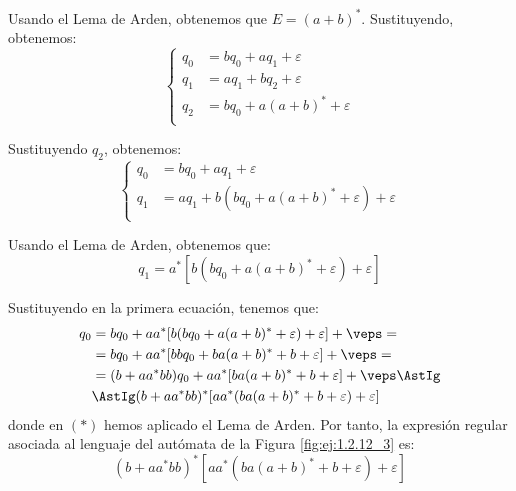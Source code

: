 \begin{ejercicio}
\begin{enumerate}
        Usando el Lema de Arden, obtenemos que $E=(a+b)^*$. Sustituyendo, obtenemos:
        \begin{equation*}
            \begin{cases}
                q_0 &= bq_0 + aq_1 + \varepsilon\\
                q_1 &= aq_1 + bq_2 + \varepsilon\\
                q_2 &= bq_0 + a(a+b)^* + \varepsilon\\
            \end{cases}
        \end{equation*}

        Sustituyendo $q_2$, obtenemos:
        \begin{equation*}
            \begin{cases}
                q_0 &= bq_0 + aq_1 + \varepsilon\\
                q_1 &= aq_1 + b(bq_0 + a(a+b)^* + \varepsilon) + \varepsilon\\
            \end{cases}
        \end{equation*}

        Usando el Lema de Arden, obtenemos que:
        \begin{equation*}
            q_1 = a^*[b(bq_0 + a(a+b)^* + \varepsilon) + \varepsilon]
        \end{equation*}

        Sustituyendo en la primera ecuación, tenemos que:
        \begin{align*}
            q_0 &= bq_0 +aa^*[b(bq_0 + a(a+b)^* + \varepsilon) + \varepsilon] + \veps=\\
            &= bq_0 + aa^*[bbq_0 + ba(a+b)^* + b + \varepsilon] + \veps =\\
            &= (b+aa^*bb)q_0 + aa^*[ba(a+b)^* + b + \varepsilon] + \veps \AstIg\\
            &\AstIg (b+aa^*bb)^*[aa^*(ba(a+b)^* + b + \varepsilon)+\varepsilon]
        \end{align*}
        donde en $(\ast)$ hemos aplicado el Lema de Arden.
        Por tanto, la expresión regular asociada al lenguaje del autómata de la Figura \ref{fig:ej:1.2.12_3} es:
        \begin{equation*}
            (b+aa^*bb)^*[aa^*(ba(a+b)^* + b + \varepsilon)+\varepsilon]
        \end{equation*}
    \end{enumerate}
\end{ejercicio}

